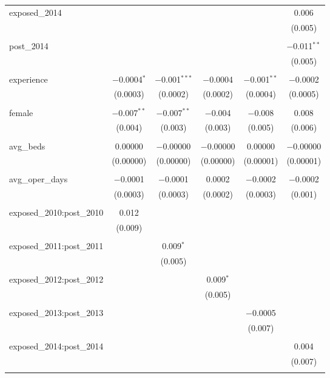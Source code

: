 \begin{table}[!htbp]
\begin{tabular}{@{\extracolsep{5pt}}lccccc}
 exposed\_2014 &  &  &  &  & 0.006 \\ 
  &  &  &  &  & (0.005) \\ 
  & & & & & \\ 
 post\_2014 &  &  &  &  & $-$0.011$^{**}$ \\ 
  &  &  &  &  & (0.005) \\ 
  & & & & & \\ 
 experience & $-$0.0004$^{*}$ & $-$0.001$^{***}$ & $-$0.0004 & $-$0.001$^{**}$ & $-$0.0002 \\ 
  & (0.0003) & (0.0002) & (0.0002) & (0.0004) & (0.0005) \\ 
  & & & & & \\ 
 female & $-$0.007$^{**}$ & $-$0.007$^{**}$ & $-$0.004 & $-$0.008 & 0.008 \\ 
  & (0.004) & (0.003) & (0.003) & (0.005) & (0.006) \\ 
  & & & & & \\ 
 avg\_beds & 0.00000 & $-$0.00000 & $-$0.00000 & 0.00000 & $-$0.00000 \\ 
  & (0.00000) & (0.00000) & (0.00000) & (0.00001) & (0.00001) \\ 
  & & & & & \\ 
 avg\_oper\_days & $-$0.0001 & $-$0.0001 & 0.0002 & $-$0.0002 & $-$0.0002 \\ 
  & (0.0003) & (0.0003) & (0.0002) & (0.0003) & (0.001) \\ 
  & & & & & \\ 
 exposed\_2010:post\_2010 & 0.012 &  &  &  &  \\ 
  & (0.009) &  &  &  &  \\ 
  & & & & & \\ 
 exposed\_2011:post\_2011 &  & 0.009$^{*}$ &  &  &  \\ 
  &  & (0.005) &  &  &  \\ 
  & & & & & \\ 
 exposed\_2012:post\_2012 &  &  & 0.009$^{*}$ &  &  \\ 
  &  &  & (0.005) &  &  \\ 
  & & & & & \\ 
 exposed\_2013:post\_2013 &  &  &  & $-$0.0005 &  \\ 
  &  &  &  & (0.007) &  \\ 
  & & & & & \\ 
 exposed\_2014:post\_2014 &  &  &  &  & 0.004 \\ 
  &  &  &  &  & (0.007) \\ 
  & & & & & \\ 

\end{tabular}
\end{table}
